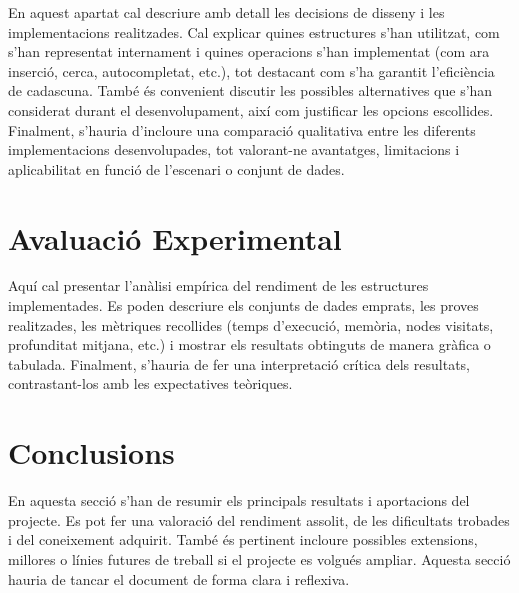 En aquest apartat cal descriure amb detall les decisions de disseny i les implementacions realitzades. Cal explicar quines estructures s’han utilitzat, com s’han representat internament i quines operacions s’han implementat (com ara inserció, cerca, autocompletat, etc.), tot destacant com s’ha garantit l’eficiència de cadascuna. També és convenient discutir les possibles alternatives que s’han considerat durant el desenvolupament, així com justificar les opcions escollides. Finalment, s’hauria d’incloure una comparació qualitativa entre les diferents implementacions desenvolupades, tot valorant-ne avantatges, limitacions i aplicabilitat en funció de l’escenari o conjunt de dades.

\section{Avaluació Experimental}

Aquí cal presentar l’anàlisi empírica del rendiment de les estructures implementades. Es poden descriure els conjunts de dades emprats, les proves realitzades, les mètriques recollides (temps d’execució, memòria, nodes visitats, profunditat mitjana, etc.) i mostrar els resultats obtinguts de manera gràfica o tabulada. Finalment, s’hauria de fer una interpretació crítica dels resultats, contrastant-los amb les expectatives teòriques.

\section{Conclusions}

En aquesta secció s’han de resumir els principals resultats i aportacions del projecte. Es pot fer una valoració del rendiment assolit, de les dificultats trobades i del coneixement adquirit. També és pertinent incloure possibles extensions, millores o línies futures de treball si el projecte es volgués ampliar. Aquesta secció hauria de tancar el document de forma clara i reflexiva.
